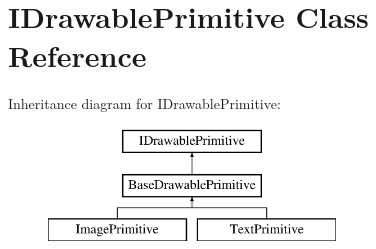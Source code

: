 \hypertarget{classIDrawablePrimitive}{}\section{I\+Drawable\+Primitive Class Reference}
\label{classIDrawablePrimitive}
Inheritance diagram for I\+Drawable\+Primitive\+:\begin{figure}[H]
\begin{center}
\leavevmode
\includegraphics[height=3.000000cm]{classIDrawablePrimitive}
\end{center}
\end{figure}

